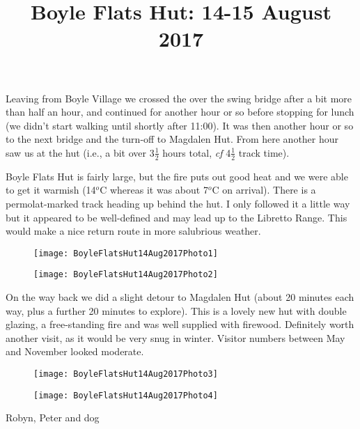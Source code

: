 \documentclass[12pt]{article} %
\title{Boyle Flats Hut: 14-15 August 2017}
\makeatletter
\renewcommand{\maketitle}{%
  {\bfseries{\scshape{\Large{\@title\par}}}}
}
\makeatother
\begin{document}
  \maketitle
Leaving from Boyle Village we crossed the over the swing bridge after a bit more than half an hour, and continued for another hour or so before stopping for lunch (we didn't start walking until shortly after 11:00).  It was then another hour or so to the next bridge and the turn-off to Magdalen Hut.  From here another hour saw us at the hut (i.e., a bit over 3$\frac{1}{2}$ hours total, \textit{cf} 4$\frac{1}{2}$ track time).

Boyle Flats Hut is fairly large, but the fire puts out good heat and we were able to get it warmish (14$^o$C whereas it was about 7$^o$C on arrival).  There is a permolat-marked track heading up behind the hut.  I only followed it a little way but it appeared to be well-defined and may lead up to the Libretto Range.  This would make a nice return route in more salubrious weather.

\begin{figure}[ht]
\begin{minipage}{.5\linewidth}
\begin{flushleft}
   \texttt{[image: BoyleFlatsHut14Aug2017Photo1]}
\end{flushleft}
\end{minipage}
\begin{minipage}{.5\linewidth}
\begin{flushright}
   \texttt{[image: BoyleFlatsHut14Aug2017Photo2]}
\end{flushright}
\end{minipage}
\end{figure}

On the way back we did a slight detour to Magdalen Hut (about 20 minutes each way, plus a further 20 minutes to explore).  This is a lovely new hut with double glazing, a free-standing fire and was well supplied with firewood.  Definitely worth another visit, as it would be very snug in winter.  Visitor numbers between May and November looked moderate.

\begin{figure}[ht]
\begin{minipage}{.5\linewidth}
\begin{flushleft}
   \texttt{[image: BoyleFlatsHut14Aug2017Photo3]}
\end{flushleft}
\end{minipage}
\begin{minipage}{.5\linewidth}
\begin{flushright}
   \texttt{[image: BoyleFlatsHut14Aug2017Photo4]}
\end{flushright}
\end{minipage}
\end{figure}

\begin{flushright}
Robyn, Peter and dog
\end{flushright}
\end{document}
